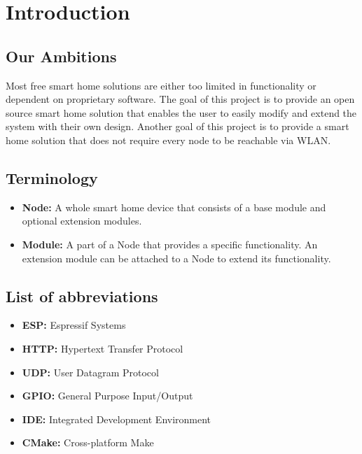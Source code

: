 \chapter{Introduction}
\renewcommand*\chapterpagestyle{scrheadings}

    \section{Our Ambitions}
        Most free smart home solutions are either too limited in
        functionality or dependent on proprietary software.
        The goal of this project is to provide an open source
        smart home solution that enables the user to easily modify 
        and extend the system with their own design. Another goal of
        this project is to provide a smart home solution that does
        not require every node to be reachable via WLAN.

    \section{Terminology}
        \begin{itemize}
            \item \textbf{Node:} A whole smart home device that
            consists of a base module and optional extension modules.

            \item \textbf{Module:} A part of a Node that provides
            a specific functionality. An extension module can be
            attached to a Node to extend its functionality.

        \end{itemize}

    \section{List of abbreviations}
        \begin{itemize}
            \item \textbf{ESP:} Espressif Systems
            \item \textbf{HTTP:} Hypertext Transfer Protocol
            \item \textbf{UDP:} User Datagram Protocol
            \item \textbf{GPIO:} General Purpose Input/Output
            \item \textbf{IDE:} Integrated Development Environment
            \item \textbf{CMake:} Cross-platform Make
        \end{itemize}


    